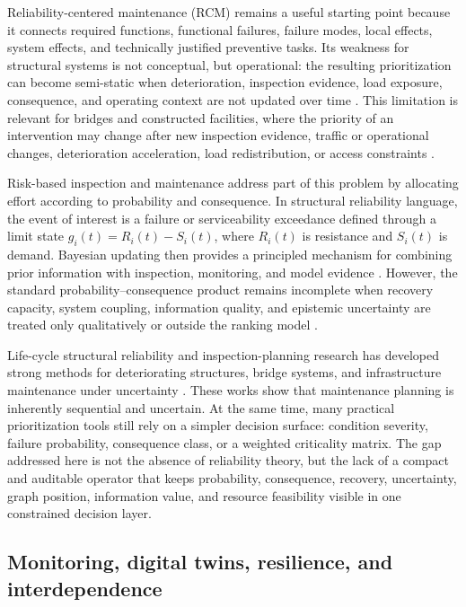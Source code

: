 \documentclass[cmes,article,submit,moreauthors,pdftex]{Definitions/tsp}
\begin{document}
Reliability-centered maintenance (RCM) remains a useful starting point because it connects required functions, functional failures, failure modes, local effects, system effects, and technically justified preventive tasks. Its weakness for structural systems is not conceptual, but operational: the resulting prioritization can become semi-static when deterioration, inspection evidence, load exposure, consequence, and operating context are not updated over time \cite{dekker1996,wang2002,garg2006,ahmad2012}. This limitation is relevant for bridges and constructed facilities, where the priority of an intervention may change after new inspection evidence, traffic or operational changes, deterioration acceleration, load redistribution, or access constraints \cite{frangopol2004,frangopol2016}.

Risk-based inspection and maintenance address part of this problem by allocating effort according to probability and consequence. In structural reliability language, the event of interest is a failure or serviceability exceedance defined through a limit state $g_i(t)=R_i(t)-S_i(t)$, where $R_i(t)$ is resistance and $S_i(t)$ is demand. Bayesian updating then provides a principled mechanism for combining prior information with inspection, monitoring, and model evidence \cite{rackwitz2001,derkiureghian2009,beck1998,kennedy2001}. However, the standard probability--consequence product remains incomplete when recovery capacity, system coupling, information quality, and epistemic uncertainty are treated only qualitatively or outside the ranking model \cite{straub2005,sorensen2009,thons2018}.

Life-cycle structural reliability and inspection-planning research has developed strong methods for deteriorating structures, bridge systems, and infrastructure maintenance under uncertainty \cite{frangopol2004,estes2001,memarzadeh2016,papakonstantinou2014a,papakonstantinou2014b}. These works show that maintenance planning is inherently sequential and uncertain. At the same time, many practical prioritization tools still rely on a simpler decision surface: condition severity, failure probability, consequence class, or a weighted criticality matrix. The gap addressed here is not the absence of reliability theory, but the lack of a compact and auditable operator that keeps probability, consequence, recovery, uncertainty, graph position, information value, and resource feasibility visible in one constrained decision layer.

\subsection{Monitoring, digital twins, resilience, and interdependence}
\end{document}
